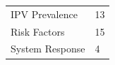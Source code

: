 \documentclass[]{tufte-handout}
\begin{document}
\begin{longtable}[]{@{}ll@{}}
\begin{minipage}[t]{0.50\columnwidth}
IPV Prevalence\strut
\end{minipage} & \begin{minipage}[t]{0.21\columnwidth}\raggedright\strut
13\strut
\end{minipage}\tabularnewline
\begin{minipage}[t]{0.50\columnwidth}\raggedright\strut
Risk Factors\strut
\end{minipage} & \begin{minipage}[t]{0.21\columnwidth}\raggedright\strut
15\strut
\end{minipage}\tabularnewline
\begin{minipage}[t]{0.50\columnwidth}\raggedright\strut
System Response\strut
\end{minipage} & \begin{minipage}[t]{0.21\columnwidth}\raggedright\strut
4\strut
\end{minipage}\tabularnewline
\bottomrule
\end{longtable}
\end{document}
